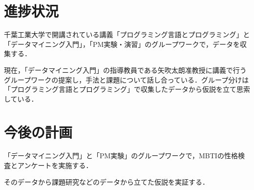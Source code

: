 \documentclass[uplatex,twocolumn,dvipdfmx]{jsarticle}
\begin{document}
\section{進捗状況}
千葉工業大学で開講されている講義「プログラミング言語とプログラミング」と「データマイニング入門」，「PM実験・演習」のグループワークで，データを収集する．

現在，「データマイニング入門」の指導教員である矢吹太朗准教授に講義で行うグループワークの提案し，手法と課題について話し合っている．グループ分けは「プログラミング言語とプログラミング」で収集したデータから仮説を立て思索している．

\section{今後の計画}
「データマイニング入門」と「PM実験」のグループワークで，MBTIの性格検査とアンケートを実施する．

そのデータから課題研究などのデータから立てた仮説を実証する．


\nocite{110003745117}

\end{document}
